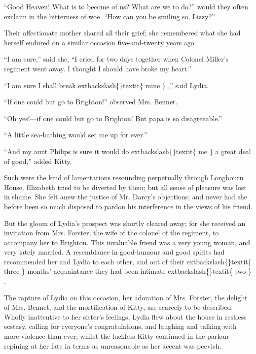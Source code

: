 \documentclass[10pt]{book}
\begin{document}
   “Good Heaven! What is to become of us? What are we to do?” would they
often exclaim in the bitterness of woe. “How can you be smiling so,
Lizzy?”
  

   Their affectionate mother shared all their grief; she remembered what
she had herself endured on a similar occasion five-and-twenty years ago.
  

   “I am sure,” said she, “I cried for two days together when Colonel
Miller’s regiment went away. I thought I should have broke my heart.”
  

   “I am sure I shall break
   	extbackslash\{\}textit\{
    mine
   \}
   ,” said Lydia.
  

   “If one could but go to Brighton!” observed Mrs. Bennet.
  

   “Oh yes!—if one could but go to Brighton! But papa is so disagreeable.”
  

   “A little sea-bathing would set me up for ever.”
  

   “And my aunt Philips is sure it would do
   	extbackslash\{\}textit\{
    me
   \}
   a great deal of good,”
added Kitty.
  

   Such were the kind of lamentations resounding perpetually through
Longbourn House. Elizabeth tried to be diverted by them; but all sense
of pleasure was lost in shame. She felt anew the justice of Mr. Darcy’s
objections; and never had she before been so much disposed to pardon his
interference in the views of his friend.
  

   But the gloom of Lydia’s prospect was shortly cleared away; for she
received an invitation from Mrs. Forster, the wife of the colonel of the
regiment, to accompany her to Brighton. This invaluable friend was a
very young woman, and very lately married. A resemblance in good-humour
and good spirits had recommended her and Lydia to each other, and out of
their
   	extbackslash\{\}textit\{
    three
   \}
   months’ acquaintance they had been intimate
   	extbackslash\{\}textit\{
    two
   \}
   .
  

   The rapture of Lydia on this occasion, her adoration of Mrs. Forster,
the delight of Mrs. Bennet, and the mortification of Kitty, are scarcely
to be described. Wholly inattentive to her sister’s feelings, Lydia flew
about the house in restless ecstasy, calling for everyone’s
congratulations, and laughing and talking with more violence than ever;
whilst the luckless Kitty continued in the parlour repining at her fate
in terms as unreasonable as her accent was peevish.
  
\end{document}
